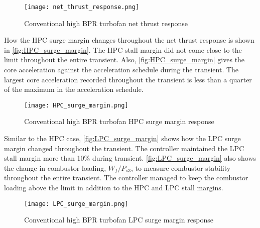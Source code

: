 \begin{figure}[!htb]
    \begin{center}
    \texttt{[image: net\_thrust\_response.png]}
    \caption{Conventional high BPR turbofan net thrust response}
    \label{fig:net_thrust_response}
    \end{center}
\end{figure}

How the HPC surge margin changes throughout the net thrust response is shown in \autoref{fig:HPC_surge_margin}. The HPC stall margin did not come close to the limit throughout the entire transient. Also, \autoref{fig:HPC_surge_margin} gives the core acceleration against the acceleration schedule during the transient. The largest core acceleration recorded throughout the transient is less than a quarter of the maximum in the acceleration schedule. 

\begin{figure}[!htb]
    \begin{center}
    \texttt{[image: HPC\_surge\_margin.png]}
    \caption{Conventional high BPR turbofan HPC surge margin response}
    \label{fig:HPC_surge_margin}
    \end{center}
\end{figure}

Similar to the HPC case, \autoref{fig:LPC_surge_margin} shows how the LPC surge margin changed throughout the transient. The controller maintained the LPC stall margin more than 10\% during transient. \autoref{fig:LPC_surge_margin} also shows the change in combustor loading, $W_f/P_{s3}$, to measure combustor stability throughout the entire transient. The controller managed to keep the combustor loading above the limit in addition to the HPC and LPC stall margins.

\begin{figure}[!htb]
    \begin{center}
    \texttt{[image: LPC\_surge\_margin.png]}
    \caption{Conventional high BPR turbofan LPC surge margin response}
    \label{fig:LPC_surge_margin}
    \end{center}
\end{figure}